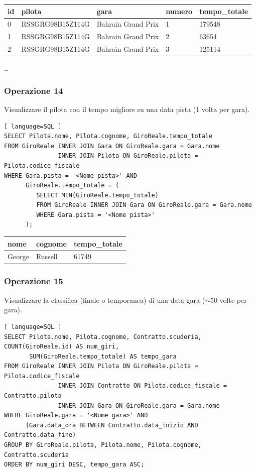 \documentclass[11pt]{article}
\begin{document}
\begin{center}
    \begin{table}[!ht]
        \centering
        \begin{tabular}{|l|l|l|l|l|}
            \hline
            id & pilota & gara & numero & tempo\_totale \\ \hline
            0 & RSSGRG98B15Z114G & Bahrain Grand Prix & 1 & 179548 \\ \hline
            1 & RSSGRG98B15Z114G & Bahrain Grand Prix & 2 & 63654 \\ \hline
            2 & RSSGRG98B15Z114G & Bahrain Grand Prix & 3 & 125114 \\ \hline
        \end{tabular}
    \end{table}
    \vspace*{-1em}
    \dots
\end{center}


\subsubsection{Operazione 14}
Visualizzare il pilota con il tempo migliore su una data pista (1 volta per gara).
\begin{lstlisting}[ language=SQL ]
SELECT Pilota.nome, Pilota.cognome, GiroReale.tempo_totale
FROM GiroReale INNER JOIN Gara ON GiroReale.gara = Gara.nome
               INNER JOIN Pilota ON GiroReale.pilota = Pilota.codice_fiscale
WHERE Gara.pista = '<Nome pista>' AND
      GiroReale.tempo_totale = (
         SELECT MIN(GiroReale.tempo_totale)
         FROM GiroReale INNER JOIN Gara ON GiroReale.gara = Gara.nome
         WHERE Gara.pista = '<Nome pista>'
      );
\end{lstlisting}

\begin{table}[!ht]
    \centering
    \begin{tabular}{|l|l|l|}
    \hline
        nome & cognome & tempo\_totale \\ \hline
        George & Russell & 61749 \\ \hline
    \end{tabular}
\end{table}


\subsubsection{Operazione 15}
Visualizzare la classifica (finale o temporanea) di una data gara ($\sim$50 volte per gara).
\begin{lstlisting}[ language=SQL ]
SELECT Pilota.nome, Pilota.cognome, Contratto.scuderia, COUNT(GiroReale.id) AS num_giri, 
       SUM(GiroReale.tempo_totale) AS tempo_gara
FROM GiroReale INNER JOIN Pilota ON GiroReale.pilota = Pilota.codice_fiscale
               INNER JOIN Contratto ON Pilota.codice_fiscale = Contratto.pilota
               INNER JOIN Gara ON GiroReale.gara = Gara.nome
WHERE GiroReale.gara = '<Nome gara>' AND
      (Gara.data_ora BETWEEN Contratto.data_inizio AND Contratto.data_fine)
GROUP BY GiroReale.pilota, Pilota.nome, Pilota.cognome, Contratto.scuderia
ORDER BY num_giri DESC, tempo_gara ASC;
\end{lstlisting}
\end{document}
